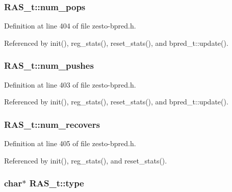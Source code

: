 \subsubsection[{num\_\-pops}]{ {\bf RAS\_\-t::num\_\-pops}\hspace{0.3cm}{\tt  [protected]}}\label{classRAS__t_1b52281a4eaca759fd29375105add8b1}




Definition at line 404 of file zesto-bpred.h.

Referenced by init(), reg\_\-stats(), reset\_\-stats(), and bpred\_\-t::update().
\subsubsection[{num\_\-pushes}]{ {\bf RAS\_\-t::num\_\-pushes}\hspace{0.3cm}{\tt  [protected]}}\label{classRAS__t_592316929c75f97e653429b2531d6207}




Definition at line 403 of file zesto-bpred.h.

Referenced by init(), reg\_\-stats(), reset\_\-stats(), and bpred\_\-t::update().
\subsubsection[{num\_\-recovers}]{ {\bf RAS\_\-t::num\_\-recovers}\hspace{0.3cm}{\tt  [protected]}}\label{classRAS__t_b2ca3b15bad8f511893986be6284c17a}




Definition at line 405 of file zesto-bpred.h.

Referenced by init(), reg\_\-stats(), and reset\_\-stats().
\subsubsection[{type}]{\setlength{\rightskip}{0pt plus 5cm}char$\ast$ {\bf RAS\_\-t::type}\hspace{0.3cm}{\tt  [protected]}}\label{classRAS__t_7efaa4ffdd024674ee3fc2bc0405eb3b}




